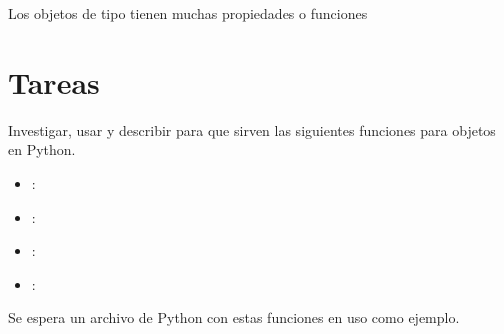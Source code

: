 \documentclass[a4paper,12pt,spanish]{sphinxmanual}
\begin{document}
\sphinxAtStartPar
Los objetos de tipo  tienen muchas propiedades o funciones


\section{Tareas}
\label{\detokenize{str:tareas}}
\sphinxAtStartPar
Investigar, usar y describir para que sirven las siguientes funciones para objetos
 en Python.
\begin{itemize}
\item {} 
\sphinxAtStartPar
{}:

\item {} 
\sphinxAtStartPar
{}:

\item {} 
\sphinxAtStartPar
{}:

\item {} 
\sphinxAtStartPar
{}:

\end{itemize}

\sphinxAtStartPar
Se espera un archivo de Python con estas funciones en uso como ejemplo.
\end{document}

